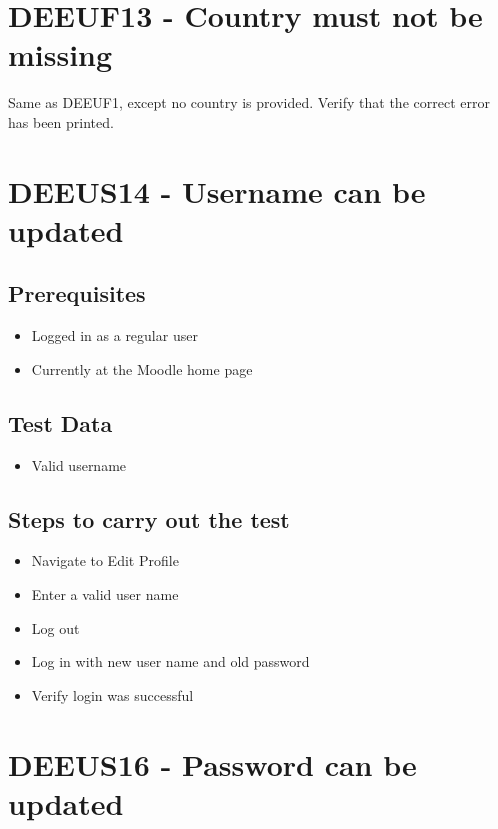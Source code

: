\documentclass{article}
\begin{document}
\section*{DEEUF13 - Country must not be missing}

Same as DEEUF1, except no country is provided.
Verify that the correct error has been printed.

\section*{DEEUS14 - Username can be updated}

\subsection*{Prerequisites}

\begin{itemize}
  \item Logged in as a regular user
  \item Currently at the Moodle home page
\end{itemize}

\subsection*{Test Data}

\begin{itemize}
  \item Valid username
\end{itemize}

\subsection*{Steps to carry out the test}

\begin{itemize}
  \item Navigate to Edit Profile
  \item Enter a valid user name
  \item Log out
  \item Log in with new user name and old password
  \item Verify login was successful
\end{itemize}

\section*{DEEUS16 - Password can be updated}
\end{document}
